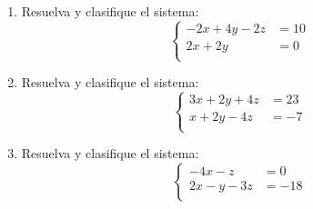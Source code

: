 \documentclass[11pt]{article}
\begin{document}
\begin{enumerate}
\[
\left\{\begin{aligned}
2x-3y+z&=-17\\
2x+3y&=8\\
\end{aligned}\right.
\]
\item Resuelva y clasifique el sistema:
\[
\left\{\begin{aligned}
-2x+4y-2z&=10\\
2x+2y&=0\\
\end{aligned}\right.
\]
\item Resuelva y clasifique el sistema:
\[
\left\{\begin{aligned}
3x+2y+4z&=23\\
x+2y-4z&=-7\\
\end{aligned}\right.
\]
\item Resuelva y clasifique el sistema:
\[
\left\{\begin{aligned}
-4x-z&=0\\
2x-y-3z&=-18\\
\end{aligned}\right.
\]
\end{enumerate}
\end{document}
